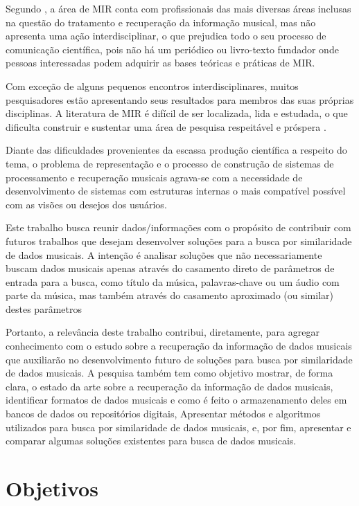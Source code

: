 Segundo , a área de MIR conta com profissionais das mais diversas áreas inclusas na questão do tratamento e recuperação da informação musical, mas não apresenta uma ação interdisciplinar, o que prejudica todo o seu processo de comunicação científica, pois não há um periódico ou livro-texto fundador onde pessoas interessadas podem adquirir as bases teóricas e práticas de MIR. 

Com exceção de alguns pequenos encontros interdisciplinares, muitos pesquisadores estão apresentando seus resultados para membros das suas próprias disciplinas. A literatura de MIR é difícil de ser localizada, lida e estudada, o que dificulta construir e sustentar uma área de pesquisa respeitável e próspera \cite{santini&souza2007}.

Diante das dificuldades provenientes da escassa produção científica a respeito do tema, o problema de representação e o processo de construção de sistemas de processamento e recuperação musicais agrava-se com a necessidade de desenvolvimento de sistemas com estruturas internas o mais compatível possível com as visões ou desejos dos usuários.

Este trabalho busca reunir dados/informações com o propósito de contribuir com futuros trabalhos que desejam desenvolver soluções para a busca por similaridade de dados musicais. A intenção é analisar soluções que não necessariamente buscam dados musicais apenas através do casamento direto de parâmetros de entrada para a busca, como título da música, palavras-chave ou um áudio com parte da música, mas também através do casamento aproximado (ou similar) destes parâmetros

Portanto, a relevância deste trabalho contribui, diretamente, para agregar conhecimento com o estudo sobre a recuperação da informação de dados musicais que auxiliarão no desenvolvimento futuro de soluções para busca por similaridade de dados musicais. A pesquisa também tem como objetivo mostrar, de forma clara, o estado da arte sobre a recuperação da informação de dados musicais, identificar formatos de dados musicais e como é feito o armazenamento deles em bancos de dados ou repositórios digitais, Apresentar métodos e algoritmos utilizados para busca por similaridade de dados musicais, e, por fim, apresentar e comparar algumas soluções existentes para busca de dados musicais.

\section{Objetivos}
